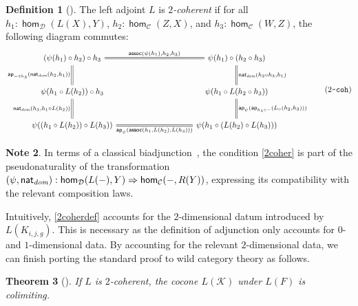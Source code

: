 \documentclass[10pt,a4paper]{article}
\newtheorem{thm}{Theorem}[section]
\theoremstyle{definition}
\newtheorem{defi}[thm]{Definition}
\newtheorem{note}[thm]{Note}
\theoremstyle{remark}
\newcommand{\C}{\mathcal C}
\newcommand{\D}{\mathcal D}
\newcommand{\K}{\mathcal K}
\newcommand{\dom}{\textit{dom}}
\newcommand{\nat}{\mathsf{nat}}
\newcommand{\0}{\mathbf{0}}
\newcommand{\1}{\mathbf{1}}
\newcommand{\2}{\mathbf{2}}
\DeclareMathOperator{\assoc}{\mathsf{assoc}}
\DeclareMathOperator{\ap}{\mathsf{ap}}
\DeclareMathOperator{\homm}{\mathsf{hom}}
\newcommand{\myhref}[2]{%
  \href{#1}{\textcolor{blue!30!black}{#2}}%
}
\begin{document}
\begin{defi}[{\cite[\myhref{https://github.com/PHart3/colimits-agda/blob/lapc-lmcs/HoTT-Agda/core/lib/wild-cats/Ladj-2-coher.agda\#L16}{ladj-is-2coher}]{2cohagda-pub}}] \label{2coherdef}
The left adjoint $L$ is \emph{$2$-coherent} if for all $h_1 : \homm_{\D}(L(X), Y)$, $h_2 : \homm_{\C}(Z, X)$, and $h_3 : \homm_{\C}(W, Z)$, the following diagram commutes:
  \[
    \label{2coher}
    \begin{tikzcd}[column sep = huge, row sep = 25]
      {\mleft( \psi(h_1) \circ h_2\mright) \circ h_3} && {\psi(h_1) \circ \mleft(h_2 \circ h_3\mright)} \\
      {\psi(h_1 \circ L(h_2)) \circ h_3} && {\psi(h_1 \circ L(h_2 \circ h_3))} \\
      {\psi(\mleft(h_1 \circ L(h_2)\mright) \circ L(h_3))} && {\psi(h_1 \circ \mleft(L(h_2) \circ L(h_3) \mright))}
      \arrow["{{\assoc(\psi(h_1), h_2, h_3)}}", Rightarrow, no head, from=1-1, to=1-3]
      \arrow["{{\nat_{\dom}(h_2 \circ h_3, h_1)}}", Rightarrow, no head, from=1-3, to=2-3]
      \arrow["{{\ap_{{-} \circ h_3}(\nat_{\dom}(h_2,h_1))}}", Rightarrow, no head, from=2-1, to=1-1]
      \arrow["{{\ap_{\psi}(\ap_{h_1 \circ {-}}(L_{\circ}(h_2,h_3)))}}", Rightarrow, no head, from=2-3, to=3-3]
      \arrow["{{\nat_{\dom}(h_3,h_1 \circ L(h_2))}}", Rightarrow, no head, from=3-1, to=2-1]
      \arrow["{{\ap_{\psi}(\assoc(h_1, L(h_2), L(h_3)))}}"', Rightarrow, no head, from=3-1, to=3-3]
    \end{tikzcd} \tag{$\texttt{$2$-coh}$} \]
\end{defi}

\begin{note}
In terms of a classical biadjunction~\cite[Section 6]{kellybiadj}, the condition \eqref{2coher} is part of the pseudonaturality of the transformation $\mleft(\psi ,\nat_{\dom} \mright) : \homm_{\D}(L({-}), Y) \Rightarrow \homm_{\C}({-}, R(Y))$, expressing its compatibility with the relevant composition laws.
\end{note}

Intuitively, \autoref{2coherdef} accounts for the $2$-dimensional datum introduced by $L(K_{i,j,g})$. This is necessary as the definition of adjunction only accounts for $0$- and $1$-dimensional data. By accounting for the relevant $2$-dimensional data, we can finish porting the standard proof to wild category theory as follows.

\begin{thm}[{\cite[\myhref{https://github.com/PHart3/colimits-agda/blob/lapc-lmcs/HoTT-Agda/core/lib/wild-cats/Ladj-colim.agda}{Ladj-colim}]{2cohagda-pub}}] \label{LAPC}
If $L$ is $2$-coherent, the cocone $L(\K)$ under $L(F)$ is colimiting. 
\end{thm}
\end{document}
